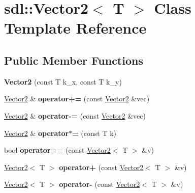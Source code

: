 \hypertarget{classsdl_1_1Vector2}{\section{sdl\-:\-:Vector2$<$ T $>$ Class Template Reference}
\label{classsdl_1_1Vector2}
}
\subsection*{Public Member Functions}
\begin{DoxyCompactItemize}
\item 
\hypertarget{classsdl_1_1Vector2_a36f53c7369926dedfac9850470ff3d3c}{{\bfseries Vector2} (const T k\-\_\-x, const T k\-\_\-y)}\label{classsdl_1_1Vector2_a36f53c7369926dedfac9850470ff3d3c}

\item 
\hypertarget{classsdl_1_1Vector2_a175f7c95664dfbec634167c1a0a29432}{\hyperlink{classsdl_1_1Vector2}{Vector2} \& {\bfseries operator+=} (const \hyperlink{classsdl_1_1Vector2}{Vector2} \&vec)}\label{classsdl_1_1Vector2_a175f7c95664dfbec634167c1a0a29432}

\item 
\hypertarget{classsdl_1_1Vector2_ab8253dd6da2c7ae9aea012d363559386}{\hyperlink{classsdl_1_1Vector2}{Vector2} \& {\bfseries operator-\/=} (const \hyperlink{classsdl_1_1Vector2}{Vector2} \&vec)}\label{classsdl_1_1Vector2_ab8253dd6da2c7ae9aea012d363559386}

\item 
\hypertarget{classsdl_1_1Vector2_a3388c6e07af1a6812de825807a4262a3}{\hyperlink{classsdl_1_1Vector2}{Vector2} \& {\bfseries operator$\ast$=} (const T k)}\label{classsdl_1_1Vector2_a3388c6e07af1a6812de825807a4262a3}

\item 
\hypertarget{classsdl_1_1Vector2_a5a8068d7240aab2c3b9da6ee8b59a28e}{bool {\bfseries operator==} (const \hyperlink{classsdl_1_1Vector2}{Vector2}$<$ T $>$ \&v)}\label{classsdl_1_1Vector2_a5a8068d7240aab2c3b9da6ee8b59a28e}

\item 
\hypertarget{classsdl_1_1Vector2_acf768f50021be483ba04a74ce6f7595a}{\hyperlink{classsdl_1_1Vector2}{Vector2}$<$ T $>$ {\bfseries operator+} (const \hyperlink{classsdl_1_1Vector2}{Vector2}$<$ T $>$ \&v)}\label{classsdl_1_1Vector2_acf768f50021be483ba04a74ce6f7595a}

\item 
\hypertarget{classsdl_1_1Vector2_a205b4a52f7510430be0f7d17edb1237a}{\hyperlink{classsdl_1_1Vector2}{Vector2}$<$ T $>$ {\bfseries operator-\/} (const \hyperlink{classsdl_1_1Vector2}{Vector2}$<$ T $>$ \&v)}\label{classsdl_1_1Vector2_a205b4a52f7510430be0f7d17edb1237a}


\end{DoxyCompactItemize}
